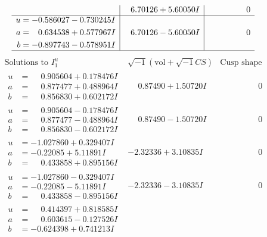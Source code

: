\documentclass[1p]{elsarticle_modified}
\theoremstyle{definition}
\newcommand{\I}{\sqrt{-1}}
\begin{document}
$$\begin{array}{c|c|c}
 & \phantom{-}6.70126 + 5.60050 I & \phantom{-0.000000 } 0 \\ \hline\begin{aligned}
u &= -0.586027 - 0.730245 I \\
a &= \phantom{-}0.634538 + 0.577967 I \\
b &= -0.897743 - 0.578951 I\end{aligned}
 & \phantom{-}6.70126 - 5.60050 I & \phantom{-0.000000 } 0\\
 \hline 
 \end{array}$$\newpage$$\begin{array}{c|c|c}  
\text{Solutions to }I^u_{1}& \I (\text{vol} + \sqrt{-1}CS) & \text{Cusp shape}\\
 \hline 
\begin{aligned}
u &= \phantom{-}0.905604 + 0.178476 I \\
a &= \phantom{-}0.877477 + 0.488964 I \\
b &= \phantom{-}0.856830 + 0.602172 I\end{aligned}
 & \phantom{-}0.87490 + 1.50720 I & \phantom{-0.000000 } 0 \\ \hline\begin{aligned}
u &= \phantom{-}0.905604 - 0.178476 I \\
a &= \phantom{-}0.877477 - 0.488964 I \\
b &= \phantom{-}0.856830 - 0.602172 I\end{aligned}
 & \phantom{-}0.87490 - 1.50720 I & \phantom{-0.000000 } 0 \\ \hline\begin{aligned}
u &= -1.027860 + 0.329407 I \\
a &= -0.22085 + 5.11891 I \\
b &= \phantom{-}0.433858 + 0.895156 I\end{aligned}
 & -2.32336 + 3.10835 I & \phantom{-0.000000 } 0 \\ \hline\begin{aligned}
u &= -1.027860 - 0.329407 I \\
a &= -0.22085 - 5.11891 I \\
b &= \phantom{-}0.433858 - 0.895156 I\end{aligned}
 & -2.32336 - 3.10835 I & \phantom{-0.000000 } 0 \\ \hline\begin{aligned}
u &= \phantom{-}0.414397 + 0.818585 I \\
a &= \phantom{-}0.603615 - 0.127526 I \\
b &= -0.624398 + 0.741213 I\end{aligned}

\end{array}$$
\end{document}
